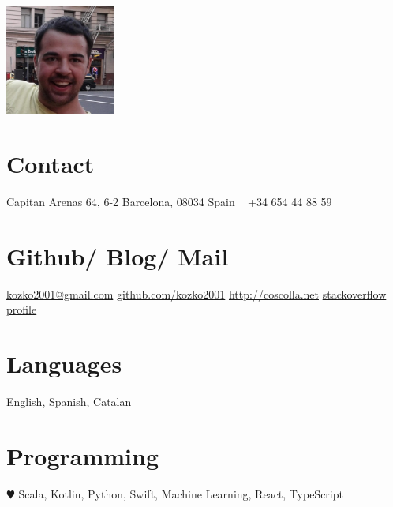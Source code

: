 \documentclass[]{friggeri-cv} %
\begin{document}


\begin{aside} %
\includegraphics[width=3.6cm]{photo}
\section{Contact}
Capitan Arenas 64, 6-2
Barcelona, 08034 
Spain
~
+34 654 44 88 59
~
\section{Github/ Blog/ Mail}
\href{mailto:kozko2001@gmail.com}{kozko2001@gmail.com}
\href{http://github.com/kozko2001}{github.com/kozko2001}
\href{http://www.coscolla.net}{http://coscolla.net}
\href{http://stackoverflow.com/users/1021445/jordi-coscolla}{stackoverflow profile}
\section{Languages}
English, Spanish, Catalan
\section{Programming}
{\color{red} $\varheartsuit$} Scala, Kotlin, Python, Swift, Machine Learning,
React, TypeScript
\end{aside}

\end{document}
